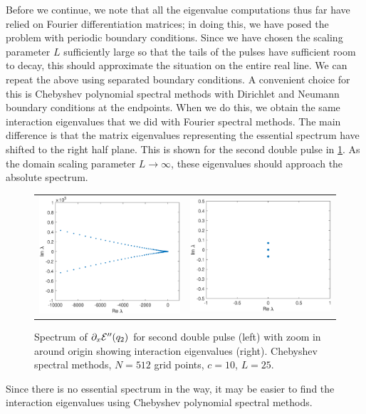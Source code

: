 \documentclass[thesis2.tex]{subfiles}
\begin{document}
Before we continue, we note that all the eigenvalue computations thus far have relied on Fourier differentiation matrices; in doing this, we have posed the problem with periodic boundary conditions. Since we have chosen the scaling parameter $L$ sufficiently large so that the tails of the pulses have sufficient room to decay, this should approximate the situation on the entire real line. We can repeat the above using separated boundary conditions. A convenient choice for this is Chebyshev polynomial spectral methods with Dirichlet and Neumann boundary conditions at the endpoints. When we do this, we obtain the same interaction eigenvalues that we did with Fourier spectral methods. The main difference is that the matrix eigenvalues representing the essential spectrum have shifted to the right half plane. This is shown for the second double pulse in \cref{fig:KdV5speccheb}. As the domain scaling parameter $L \rightarrow \infty$, these eigenvalues should approach the absolute spectrum.
\begin{figure}
\begin{center}
\begin{tabular}{cc}
\includegraphics[width=6cm]{images/kdv5numerics/double2speccheb} &
\includegraphics[width=6cm]{images/kdv5numerics/double2specchebzoom.eps} \\
\end{tabular}
\caption[Spectrum of double pulses in KdV5 (Chebyshev spectral methods)]{Spectrum of $\partial_x \mathcal{E}''(q_2)$ for second double pulse (left) with zoom in around origin showing interaction eigenvalues (right). Chebyshev spectral methods, $N = 512$ grid points, $c = 10$, $L = 25$.}
\label{fig:KdV5speccheb}
\end{center}
\end{figure}
Since there is no essential spectrum in the way, it may be easier to find the interaction eigenvalues using Chebyshev polynomial spectral methods.
\end{document}
